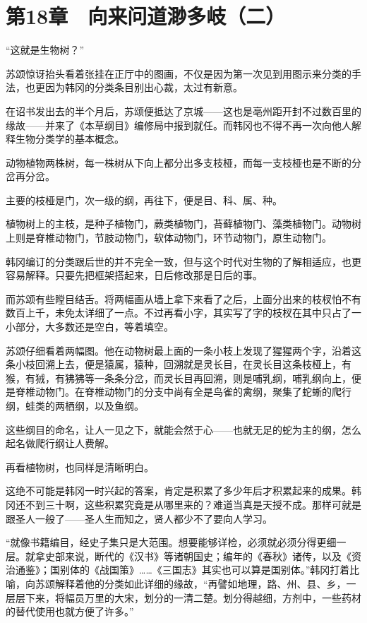 \section{第18章　向来问道渺多岐（二）}

“这就是生物树？” 

苏颂惊讶抬头看着张挂在正厅中的图画，不仅是因为第一次见到用图示来分类的手法，也更因为韩冈的分类条目别出心裁，太过有新意。 

在诏书发出去的半个月后，苏颂便抵达了京城——这也是亳州距开封不过数百里的缘故——并来了《本草纲目》编修局中报到就任。而韩冈也不得不再一次向他人解释生物分类学的基本概念。 

动物植物两株树，每一株树从下向上都分出多支枝桠，而每一支枝桠也是不断的分岔再分岔。 

主要的枝桠是门，次一级的纲，再往下，便是目、科、属、种。 

植物树上的主枝，是种子植物门，蕨类植物门，苔藓植物门、藻类植物门。动物树上则是脊椎动物门，节肢动物门，软体动物门，环节动物门，原生动物门。 

韩冈编订的分类跟后世的并不完全一致，但与这个时代对生物的了解相适应，也更容易解释。只要先把框架搭起来，日后修改那是日后的事。 

而苏颂有些瞠目结舌。将两幅画从墙上拿下来看了之后，上面分出来的枝杈怕不有数百上千，未免太详细了一点。不过再看小字，其实写了字的枝杈在其中只占了一小部分，大多数还是空白，等着填空。 

苏颂仔细看着两幅图。他在动物树最上面的一条小枝上发现了猩猩两个字，沿着这条小枝回溯上去，便是猿属，猿种，回溯就是灵长目，在灵长目这条枝桠上，有猴，有狨，有狒狒等一条条分岔，而灵长目再回溯，则是哺乳纲，哺乳纲向上，便是脊椎动物门。在脊椎动物门的分支中尚有全是鸟雀的禽纲，聚集了蛇蜥的爬行纲，蛙类的两栖纲，以及鱼纲。 

这些纲目的命名，让人一见之下，就能会然于心——也就无足的蛇为主的纲，怎么起名做爬行纲让人费解。 

再看植物树，也同样是清晰明白。 

这绝不可能是韩冈一时兴起的答案，肯定是积累了多少年后才积累起来的成果。韩冈还不到三十啊，这些积累究竟是从哪里来的？难道当真是天授不成。那样可就是跟圣人一般了——圣人生而知之，贤人都少不了要向人学习。 

“就像书籍编目，经史子集只是大范围。想要能够详检，必须就必须分得更细一层。就拿史部来说，断代的《汉书》等诸朝国史；编年的《春秋》诸传，以及《资治通鉴》；国别体的《战国策》……《三国志》其实也可以算是国别体。”韩冈打着比喻，向苏颂解释着他的分类如此详细的缘故，“再譬如地理，路、州、县、乡，一层层下来，将幅员万里的大宋，划分的一清二楚。划分得越细，方剂中，一些药材的替代使用也就方便了许多。” 

